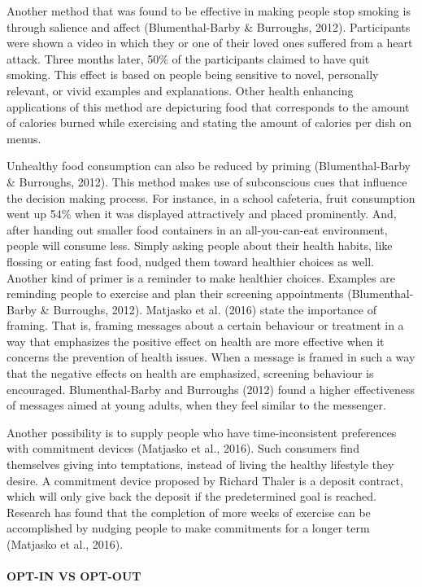 \documentclass[]{article}
\let\oldparagraph\paragraph
\renewcommand{\paragraph}[1]{\oldparagraph{#1}\mbox{}}
\begin{document}
Another method that was found to be effective in making people stop
smoking is through salience and affect (Blumenthal-Barby \& Burroughs,
2012). Participants were shown a video in which they or one of their
loved ones suffered from a heart attack. Three months later, 50\% of the
participants claimed to have quit smoking. This effect is based on
people being sensitive to novel, personally relevant, or vivid examples
and explanations. Other health enhancing applications of this method are
depicturing food that corresponds to the amount of calories burned while
exercising and stating the amount of calories per dish on menus.

Unhealthy food consumption can also be reduced by priming
(Blumenthal-Barby \& Burroughs, 2012). This method makes use of
subconscious cues that influence the decision making process. For
instance, in a school cafeteria, fruit consumption went up 54\% when it
was displayed attractively and placed prominently. And, after handing
out smaller food containers in an all-you-can-eat environment, people
will consume less. Simply asking people about their health habits, like
flossing or eating fast food, nudged them toward healthier choices as
well. Another kind of primer is a reminder to make healthier choices.
Examples are reminding people to exercise and plan their screening
appointments (Blumenthal-Barby \& Burroughs, 2012). Matjasko et al.
(2016) state the importance of framing. That is, framing messages about
a certain behaviour or treatment in a way that emphasizes the positive
effect on health are more effective when it concerns the prevention of
health issues. When a message is framed in such a way that the negative
effects on health are emphasized, screening behaviour is encouraged.
Blumenthal-Barby and Burroughs (2012) found a higher effectiveness of
messages aimed at young adults, when they feel similar to the messenger.

Another possibility is to supply people who have time-inconsistent
preferences with commitment devices (Matjasko et al., 2016). Such
consumers find themselves giving into temptations, instead of living the
healthy lifestyle they desire. A commitment device proposed by Richard
Thaler is a deposit contract, which will only give back the deposit if
the predetermined goal is reached. Research has found that the
completion of more weeks of exercise can be accomplished by nudging
people to make commitments for a longer term (Matjasko et al., 2016).

\paragraph{OPT-IN VS OPT-OUT}\label{opt-in-vs-opt-out}
\end{document}
